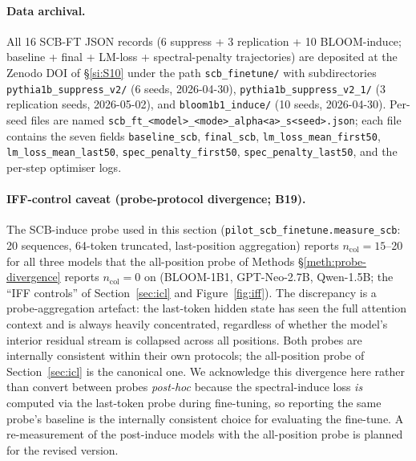\documentclass[11pt,a4paper]{article}
\begin{document}
\paragraph{Data archival.}
All 16 SCB-FT JSON records (6 suppress + 3 replication +
10 BLOOM-induce; baseline + final + LM-loss + spectral-penalty
trajectories) are deposited at the Zenodo DOI of \S\ref{si:S10}
under the path \texttt{scb\_finetune/} with subdirectories
\texttt{pythia1b\_suppress\_v2/} (6 seeds, 2026-04-30),
\texttt{pythia1b\_suppress\_v2\_1/} (3 replication seeds, 2026-05-02),
and \texttt{bloom1b1\_induce/} (10 seeds, 2026-04-30). Per-seed
files are named \texttt{scb\_ft\_<model>\_<mode>\_alpha<a>\_s<seed>.json};
each file contains the seven fields
\texttt{baseline\_scb}, \texttt{final\_scb}, \texttt{lm\_loss\_mean\_first50},
\texttt{lm\_loss\_mean\_last50}, \texttt{spec\_penalty\_first50},
\texttt{spec\_penalty\_last50}, and the per-step optimiser logs.

\paragraph{IFF-control caveat (probe-protocol divergence; B19).}
The SCB-induce probe used in this section
(\texttt{pilot\_scb\_finetune.measure\_scb}: 20 sequences, 64-token
truncated, last-position aggregation) reports
$n_\mathrm{col} = 15$--20 for all three models that the all-position
probe of Methods \S\ref{meth:probe-divergence} reports
$n_\mathrm{col} = 0$ on (BLOOM-1B1, GPT-Neo-2.7B, Qwen-1.5B; the
``IFF controls'' of Section~\ref{sec:icl} and Figure~\ref{fig:iff}).
The discrepancy is a probe-aggregation artefact: the last-token
hidden state has seen the full attention context and is always
heavily concentrated, regardless of whether the model's interior
residual stream is collapsed across all positions. Both probes are
internally consistent within their own protocols; the all-position
probe of Section~\ref{sec:icl} is the canonical one. We acknowledge
this divergence here rather than convert between probes \emph{post-hoc}
because the spectral-induce loss \emph{is} computed via the
last-token probe during fine-tuning, so reporting the same probe's
baseline is the internally consistent choice for evaluating the
fine-tune. A re-measurement of the post-induce models with the
all-position probe is planned for the revised version.
\end{document}
